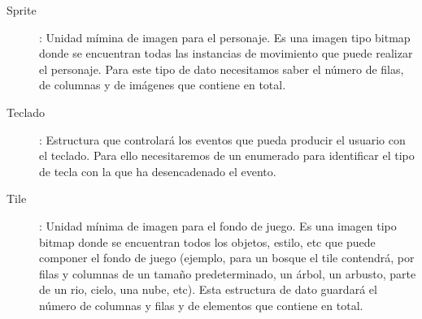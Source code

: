 \documentclass[a4paper,10pt]{article}
\begin{document}
\begin{description}
\item [Sprite]: Unidad mímina de imagen para el personaje. Es una imagen tipo
  bitmap donde se encuentran todas las instancias de movimiento que puede
  realizar el personaje. Para este tipo de dato necesitamos saber el número de
  filas, de columnas y de imágenes que contiene en total.

\item [Teclado]: Estructura que controlará los eventos que pueda producir el
  usuario con el teclado. Para ello necesitaremos de un enumerado para
  identificar el tipo de tecla con la que ha desencadenado el evento.

\item [Tile]: Unidad mínima de imagen para el fondo de juego. Es una imagen tipo
  bitmap donde se encuentran todos los objetos, estilo, etc que puede componer
  el fondo de juego (ejemplo, para un bosque el tile contendrá, por filas y
  columnas de un tamaño predeterminado, un árbol, un arbusto, parte de un rio,
  cielo, una nube, etc). Esta estructura de dato guardará el número de columnas
  y filas y de elementos que contiene en total.

\end{description}
\end{document}
